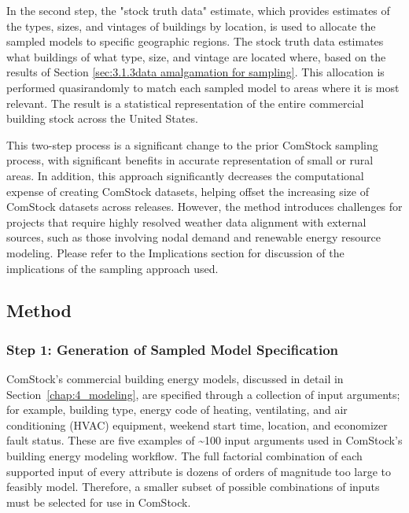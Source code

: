 In the second step, the "stock truth data" estimate, which provides estimates of the types, sizes, and vintages of buildings by location, is used to allocate the sampled models to specific geographic regions. The stock truth data estimates what buildings of what type, size, and vintage are located where, based on the results of Section \ref{sec:3.1.3data amalgamation for sampling}. This allocation is performed quasirandomly to match each sampled model to areas where it is most relevant. The result is a statistical representation of the entire commercial building stock across the United States.

This two-step process is a significant change to the prior ComStock sampling process, with significant benefits in accurate representation of small or rural areas. In addition, this approach significantly decreases the computational expense of creating ComStock datasets, helping offset the increasing size of ComStock datasets across releases. However, the method introduces challenges for projects that require highly resolved weather data alignment with external sources, such as those involving nodal demand and renewable energy resource modeling. Please refer to the Implications section for discussion of the implications of the sampling approach used.

\subsection{Method}
\subsubsection{Step 1: Generation of Sampled Model Specification}
ComStock's commercial building energy models, discussed in detail in Section~\ref{chap:4_modeling}, are specified through a collection of input arguments; for example, building type, energy code of heating, ventilating, and air conditioning (HVAC) equipment, weekend start time, location, and economizer fault status. These are five examples of \textasciitilde100 input arguments used in ComStock's building energy modeling workflow. The full factorial combination of each supported input of every attribute is dozens of orders of magnitude too large to feasibly model. Therefore, a smaller subset of possible combinations of inputs must be selected for use in ComStock.

